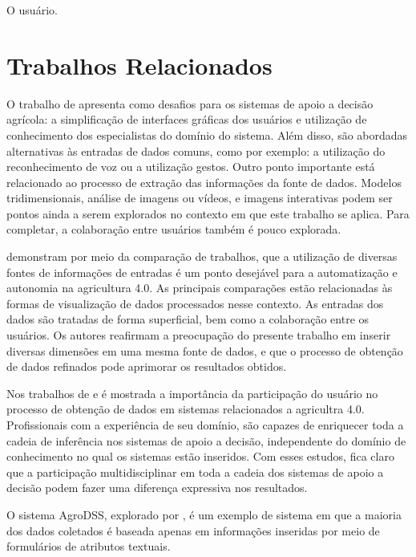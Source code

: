 \documentclass[12pt]{article}
\begin{document}
O usuário.

\section{Trabalhos Relacionados}
\label{sec:trabalhos_relacionados}

O trabalho de  apresenta como desafios para os sistemas de apoio a decisão agrícola: a simplificação de interfaces gráficas dos usuários e utilização de conhecimento dos especialistas do domínio do sistema. Além disso, são abordadas alternativas às entradas de dados comuns, como por exemplo: a utilização do reconhecimento de voz ou a utilização gestos. Outro ponto importante está relacionado ao processo de extração das informações da fonte de dados. Modelos tridimensionais, análise de imagens ou vídeos, e imagens interativas podem ser pontos ainda a serem explorados no contexto em que este trabalho se aplica. Para completar, a colaboração entre usuários também é pouco explorada.

 demonstram por meio da comparação de trabalhos, que a utilização de diversas fontes de informações de entradas é um ponto desejável para a automatização e autonomia na agricultura 4.0. As principais comparações estão relacionadas às formas de visualização de dados processados nesse contexto. As entradas dos dados são tratadas de forma superficial, bem como a colaboração entre os usuários. Os autores reafirmam a preocupação do presente trabalho em inserir diversas dimensões em uma mesma fonte de dados, e que o processo de obtenção de dados refinados pode aprimorar os resultados obtidos.

Nos trabalhos de  e  é mostrada a importância da participação do usuário no processo de obtenção de dados em sistemas relacionados a agricultra 4.0. Profissionais com a experiência de seu domínio, são capazes de enriquecer toda a cadeia de inferência nos sistemas de apoio a decisão, independente do domínio de conhecimento no qual os sistemas estão inseridos. Com esses estudos, fica claro que a participação multidisciplinar em toda a cadeia dos sistemas de apoio a decisão podem fazer uma diferença expressiva nos resultados.

O sistema AgroDSS, explorado por , é um exemplo de sistema em que a maioria dos dados coletados é baseada apenas em informações inseridas por meio de formulários de atributos textuais.
\end{document}

